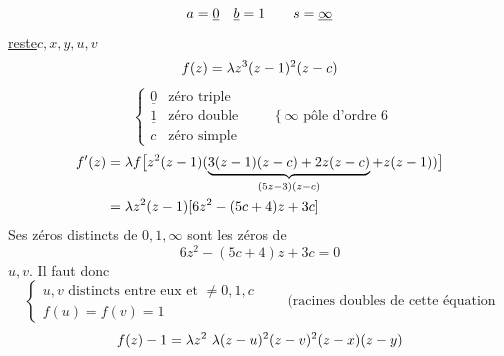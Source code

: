 
\[a=\underline0\quad\underline b=1\qquad s=\underline\infty\]
\uline{reste}\quad$c,x,y,u,v$
\[f(z)=\lambda z^3(z-1)^2(z-c)\]
\[
\left\{\begin{array}{ll}\underline0&\text{zéro triple}\\\underline1&\text{zéro double}\\c&\text{zéro simple}\end{array}\right.
\qquad\left\{\infty\text{ pôle d'ordre }6\right.
\]
\[
\begin{aligned}
f'(z)&=\lambda f\bigl[z^2(z-1)(\underbrace{3(z-1)(z-c)+2z(z-c)}_{(5z-3)(z-c)}+z(z-1))\bigr]\\
&=\lambda z^2(z-1)[6z^2-(5c+4)z+3c]
\end{aligned}
\]
Ses zéros distincts de $0,1,\infty$ sont les zéros de
\[6z^2-(5c+4)z+3c=0\]
 $u,v$. Il faut donc 
\[
\left\{\begin{array}{l}u,v\text{ distincts entre eux et }\ne0,1,c\\f(u)=f(v)=1\end{array}\right.
\qquad\text{(racines doubles de cette équation}
\]
\[f(z)-1=\deleted{\unsure{\lambda z^2}}\ \lambda(z-u)^2(z-v)^2(z-x)(z-y)\]
